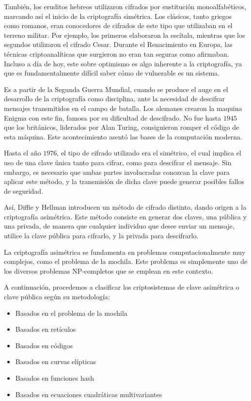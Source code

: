 También, los eruditos hebreos utilizaron cifrados por sustitución monoalfabéticos, marcando así el inicio de la criptografía simétrica. Los clásicos, tanto griegos como romanos, eran conocedores de cifrados de este tipo que utilizaban en el terreno militar. Por ejemplo, los primeros elaboraron la escítala, mientras que los segundos utilizaron el cifrado Cesar. Durante el Renacimiento en Europa, las técnicas criptoanalíticas que surgieron no eran tan seguras como afirmaban. Incluso a día de hoy, este sobre optimismo es algo inherente a la criptografía, ya que es fundamentalmente difícil saber cómo de vulnerable es un sistema.

Es a partir de la Segunda Guerra Mundial, cuando se produce el auge en el desarrollo de la criptografía como disciplina, ante la necesidad de descifrar mensajes transmitidos en el campo de batalla. Los alemanes crearon la maquina Enigma con este fin, famosa por su dificultad de descifrado. No fue hasta $1945$ que los británicos, liderados por Alan Turing, consiguieron romper el código de esta máquina. Este acontecimiento asentó las bases de la computación moderna.

Hasta el año $1976$, el tipo de cifrado utilizado era el simétrico, el cual implica el uso de una clave única tanto para cifrar, como para descifrar el mensaje. Sin embargo, es necesario que ambas partes involucradas conozcan la clave para aplicar este método, y la transmisión de dicha clave puede generar posibles fallos de seguridad. 

Así, Diffie y Hellman introducen un método de cifrado distinto, dando origen a la criptografía asimétrica. Este método consiste en generar dos claves, una pública y una privada, de manera que cualquier individuo que desee enviar un mensaje, utilice la clave pública para cifrarlo, y la privada para descifrarlo.

La criptografía asimétrica se fundamenta en problemas computacionalmente muy complejos, como el problema de la mochila. Este problema es simplemente uno de los diversos problemas NP-completos que se emplean en este contexto.

A continuación, procedemos a clasificar los criptosistemas de clave asimétrica o clave pública según su metodología:
\begin{itemize}
    \item Basados en el problema de la mochila
    \item Basados en retículos
    \item Basados en códigos
    \item Basados en curvas elípticas
    \item Basados en funciones hash
    \item Basados en ecuaciones cuadráticas multivariantes
\end{itemize}

